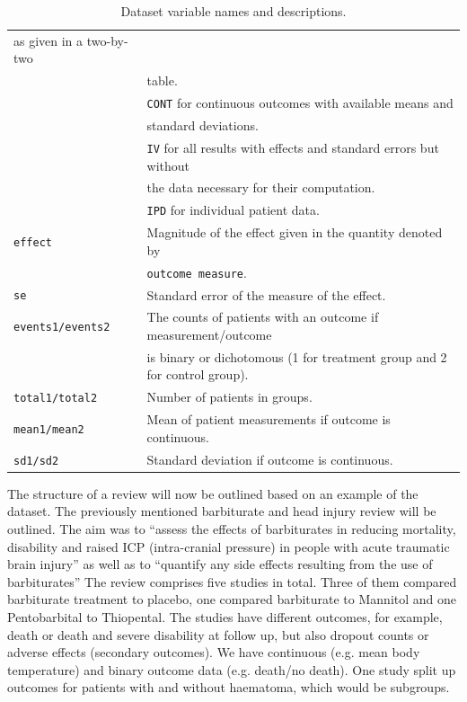 \documentclass[11pt,a4paper,twoside]{book}\usepackage[]{graphicx}\usepackage[]{color}
\begin{document}
\begin{table}[ht]
\begin{center}
\begin{tabular}{ll}
      as given in a two-by-two \\ &table. \\ &\texttt{CONT} for continuous outcomes with available means and \\ &standard deviations. \\ & \texttt{IV} for all results with effects and standard errors but without \\ & the data necessary for their computation. \\ &\texttt{IPD} for individual patient data.\\
      \texttt{effect} & Magnitude of the effect given in the quantity denoted by \\ &\texttt{outcome measure}.\\
      \texttt{se} & Standard error of the measure of the effect.\\
      \texttt{events1/events2} & The counts of patients with an outcome if measurement/outcome \\ &is binary or dichotomous (1 for treatment group and 2 for control group).\\
      \texttt{total1/total2} & Number of patients in groups.\\
      \texttt{mean1/mean2} & Mean of patient measurements if outcome is continuous.\\
      \texttt{sd1/sd2} & Standard deviation if outcome is continuous.
    \end{tabular}
  \caption{Dataset variable names and descriptions.  \label{variable}}
  \label{variable}
  \end{center}
\end{table}

\vspace{0mm}
The structure of a review will now be outlined based on an example of the dataset. The previously mentioned barbiturate and head injury review will be outlined. The aim was to ``assess the effects of barbiturates in reducing mortality, disability and raised ICP (intra-cranial pressure) in people with acute traumatic brain injury'' as well as to ``quantify any side effects resulting from the use of barbiturates'' %
The review comprises five studies in total. Three of them compared barbiturate treatment to placebo, one compared barbiturate to Mannitol and one Pentobarbital to Thiopental. The studies have different outcomes, for example, death or death and severe disability at follow up, but also dropout counts or adverse effects (secondary outcomes).
We have continuous (e.g. mean body temperature) and binary outcome data (e.g. death/no death). One study split up outcomes for patients with and without haematoma, which would be subgroups. %
\end{document}
